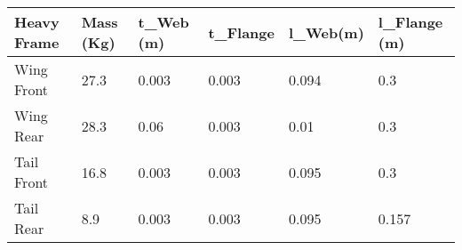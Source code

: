 \begin{tabular}{llllll}
Heavy Frame & Mass (Kg) & t_{Web} (m) & t_{Flange} & l_{Web}(m) & l_{Flange} (m) \\ 
\hline 
Wing Front & 27.3 & 0.003 & 0.003 & 0.094 & 0.3 \\ 
Wing Rear & 28.3 & 0.06 & 0.003 & 0.01 & 0.3 \\ 
Tail Front & 16.8 & 0.003 & 0.003 & 0.095 & 0.3 \\ 
Tail Rear & 8.9 & 0.003 & 0.003 & 0.095 & 0.157 \\ 
\hline 
\end{tabular}